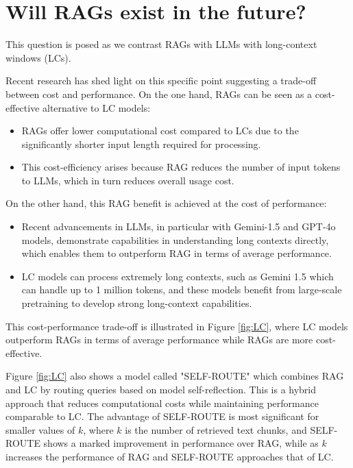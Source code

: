 \section{Will RAGs exist in the future?}

This question is posed as we contrast RAGs with LLMs with long-context windows (LCs).

Recent research has shed light on this specific point  suggesting a trade-off between cost and performance. On the one hand, RAGs can be seen as a cost-effective alternative to LC models:
\begin{itemize}
\item RAGs offer lower computational cost compared to LCs due to the significantly shorter input length required for processing.
\item This cost-efficiency arises because RAG reduces the number of input tokens to LLMs, which in turn reduces overall usage cost.
\end{itemize}

On the other hand, this RAG benefit is achieved at the cost of performance:
\begin{itemize}
\item Recent advancements in LLMs, in particular with Gemini-1.5 and GPT-4o models, demonstrate capabilities in understanding long contexts directly, which enables them to outperform RAG in terms of average performance.
\item LC models can process extremely long contexts, such as Gemini 1.5 which can handle up to 1 million tokens, and these models benefit from large-scale pretraining to develop strong long-context capabilities.
\end{itemize}

This cost-performance trade-off is illustrated in Figure \ref{fig:LC}, where LC models outperform RAGs in terms of average performance while RAGs are more cost-effective.

Figure \ref{fig:LC} also shows a model called "SELF-ROUTE" which combines RAG and LC by routing queries based on model self-reflection. This is a hybrid approach that reduces computational costs while maintaining performance comparable to LC. The advantage of SELF-ROUTE is most significant for smaller values of $k$, where $k$ is the number of retrieved text chunks, and SELF-ROUTE shows a marked improvement in performance over RAG, while as $k$ increases the performance of RAG and SELF-ROUTE approaches that of LC.

